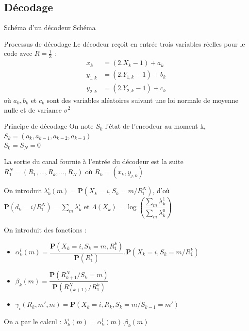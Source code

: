 \documentclass[11pt]{beamer}
\begin{document}
\subsection{D\'ecodage}
\begin{frame}{Sch\'ema d'un d\'ecodeur}
	Sch\'ema
\end{frame}

\begin{frame}{Processus de d\'ecodage}
	Le d\'ecodeur re\c{c}oit en entr\'ee trois variables r\'eelles pour le code avec $R = \frac{1}{3}$ :
	\begin{align*} \label{dec_input}
		x_k & = (2.X_k - 1) + a_k \\
		y_{1,k} & = (2.Y_{1,k} - 1) + b_k \\
		y_{2,k} & = (2.Y_{2,k} - 1) + c_k
	\end{align*}
	o\`u $a_k, b_k$ et $c_k$ sont des variables al\'eatoires suivant une loi normale de moyenne nulle et de variance $\sigma^2$
\end{frame}

\begin{frame}{Principe de d\'ecodage}
	On note $S_k$ l'\'etat de l'encodeur au moment k, $S_k = (a_k, a_{k-1}, a_{k-2}, a_{k-3})$ \\
	$S_0 = S_N = 0$ \\ \smallskip

	La sortie du canal fournie \`a l'entr\'ee du d\'ecodeur est la suite $R_1^N = (R_1,\ldots,R_k,\ldots,R_N)$
	o\`u $R_k = (x_k,y_{j,k})$ \\ \smallskip
	
	On introduit $\lambda_k^i(m) = \mathbf{P}(X_k = i, S_k = m / R_1^N)$, d'o\`u $\mathbf{P}(d_k = i / R_1^N) = \sum\limits_{m} \lambda_k^i$ et $\Lambda(X_k) = \log\left(\dfrac{\sum\limits_{m} \lambda_k^1}{\sum\limits_{m} \lambda_k^0}\right) $
\end{frame}

\begin{frame}
	On introduit des fonctions :
	\begin{itemize}
		\item $\alpha_k^i(m) = \dfrac{\mathbf{P}(X_k = i, S_k = m, R_1^k)}{\mathbf{P}(R_1^k)}.\mathbf{P}(X_k = i, S_k = m / R_1^k)$
		\item $\beta_k(m) = \dfrac{\mathbf{P}(R_{k+1}^N / S_k = m)}{\mathbf{P}(R_(k+1)^N / R_1^k)}$
		\item $\gamma_i(R_k, m', m) = \mathbf{P}(X_k = i, R_k, S_k = m/ S_{k-1} = m')$
	\end{itemize}
	On a par le calcul : $\lambda_k^i(m) = \alpha_k^i(m).\beta_k(m)$
\end{frame}
\end{document}
